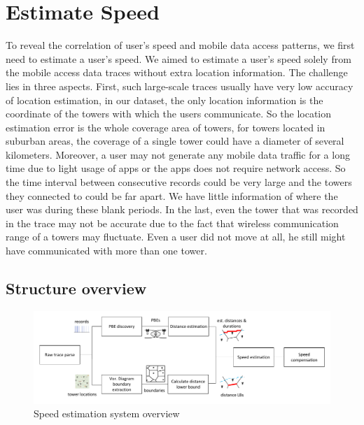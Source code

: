 \section{Estimate Speed}

To reveal the correlation of user's speed and mobile data access patterns, we first need to estimate a user's speed. We aimed to estimate a user's speed solely from the mobile access data traces without extra location information. The challenge lies in three aspects. First, such large-scale traces usually have very low accuracy of location estimation, in our dataset, the only location information is the coordinate of the towers with which the users communicate. So the location estimation error is the whole coverage area of towers, for towers located in suburban areas, the coverage of a single tower could have a diameter of several kilometers. Moreover, a user may not generate any mobile data traffic for a long time due to light usage of apps or the apps does not require network access. So the time interval between consecutive records could be very large and the towers they connected to could be far apart. We have little information of where the user was during these blank periods. In the last, even the tower that was recorded in the trace may not be accurate due to the fact that wireless communication range of a towers may fluctuate. Even a user did not move at all, he still might have communicated with more than one tower. 

\subsection{Structure overview}

\begin{figure}[ht]
    \centering
    \includegraphics[width=\linewidth]{./figures/system_overview.pdf}
    \caption{Speed estimation system overview}
    \label{fig:system_overview}
\end{figure}

